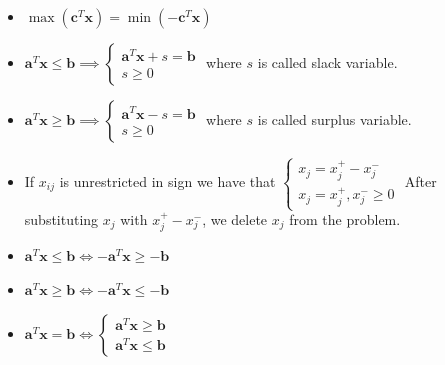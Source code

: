 \documentclass[12pt, a4paper]{report}
\begin{document}
    \begin{itemize}
        \item $\max{(\boldsymbol{c}^T\boldsymbol{x})}=\min{(-\boldsymbol{c}^T\boldsymbol{x})}$
        \item $\boldsymbol{a}^T\boldsymbol{x} \leq \boldsymbol{b} \implies \begin{cases}
            \boldsymbol{a}^T\boldsymbol{x}+s=\boldsymbol{b} \\
            s \geq 0
            \end{cases}$
            where $s$ is called slack variable. 
        \item $\boldsymbol{a}^T\boldsymbol{x} \geq \boldsymbol{b} \implies \begin{cases}
            \boldsymbol{a}^T\boldsymbol{x}-s=\boldsymbol{b} \\
            s \geq 0
            \end{cases}$
            where $s$ is called surplus variable. 
        \item If $x_{ij}$ is unrestricted in sign we have that $\begin{cases}
            x_j=x_j^{+}-x_j^{-} \\
            x_j=x_j^{+},x_j^{-} \geq 0
            \end{cases}$
            After substituting $x_j$ with $x_j^{+}-x_j^{-}$, we delete $x_j$ from the problem. 
        \item $\boldsymbol{a}^T\boldsymbol{x} \leq \boldsymbol{b} \Leftrightarrow -\boldsymbol{a}^T\boldsymbol{x} \geq -\boldsymbol{b}$
        \item $\boldsymbol{a}^T\boldsymbol{x} \geq \boldsymbol{b} \Leftrightarrow -\boldsymbol{a}^T\boldsymbol{x} \leq -\boldsymbol{b}$
        \item $\boldsymbol{a}^T\boldsymbol{x} = \boldsymbol{b} \Leftrightarrow \begin{cases}
            \boldsymbol{a}^T\boldsymbol{x} \geq \boldsymbol{b} \\
            \boldsymbol{a}^T\boldsymbol{x} \leq \boldsymbol{b}
        \end{cases}$
    \end{itemize}
\end{document}
